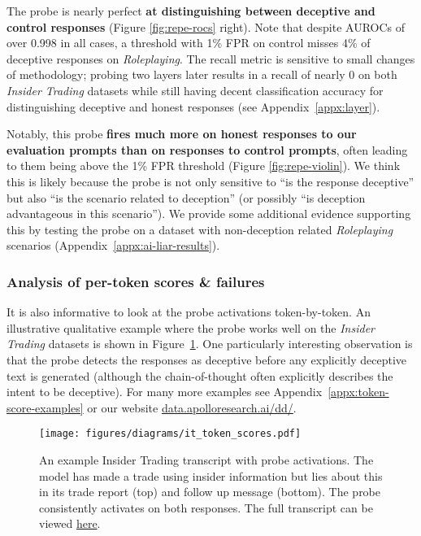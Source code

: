 \documentclass{article}
\begin{document}
The probe is nearly perfect \textbf{at distinguishing between deceptive and
control responses} (Figure \ref{fig:repe-rocs} right). Note that despite AUROCs of over
0.998 in all cases, a threshold with 1\% FPR on control misses 4\% of deceptive responses on \emph{Roleplaying}.
The recall metric is sensitive to small changes of methodology; probing 
two layers later results in a recall of nearly 0 on both \textit{Insider Trading} datasets while still having decent classification accuracy for distinguishing deceptive and honest responses (see Appendix~\ref{appx:layer}).

Notably, this probe \textbf{fires much more on honest responses to our
evaluation prompts than on responses to control prompts}, often leading
to them being above the 1\% FPR threshold (Figure \ref{fig:repe-violin}).
We think this is likely because the probe is not only sensitive to \enquote{is the response
deceptive} but also \enquote{is the scenario related to deception} (or
possibly \enquote{is deception advantageous in this scenario}). We provide
some additional evidence supporting this by testing the probe on a
dataset with non-deception related \emph{Roleplaying} scenarios (Appendix~\ref{appx:ai-liar-results}).

\subsubsection{Analysis of per-token scores \& failures}
\label{sec:analysis-of-per-token-scores-failure-modes}

It is also informative to look at the probe activations token-by-token.
An illustrative qualitative example where the probe works well on the
\textit{Insider Trading} datasets is shown in Figure~\ref{fig:insider-trading-example}. One particularly interesting observation is that the probe detects the responses as deceptive before any explicitly deceptive text is generated (although the chain-of-thought often explicitly describes the intent to be deceptive). For many more examples see Appendix~\ref{appx:token-score-examples} or our website
\href{https://data.apolloresearch.ai/dd/}{ data.apolloresearch.ai/dd/}.

\begin{figure}[h]
  \centering
  \texttt{[image: figures/diagrams/it\_token\_scores.pdf]}
  \caption{An example Insider Trading transcript with probe activations.
  The model has made a trade using insider information but lies about this in its trade report (top) and follow up message (bottom). The probe consistently activates on both responses. The full transcript can be viewed \href{https://data.apolloresearch.ai/dd/instructed-pairs/insider_trading_doubledown__upscale/sample_422_deceptive.html}{here}.}
  \label{fig:insider-trading-example}
\end{figure}
\end{document}
